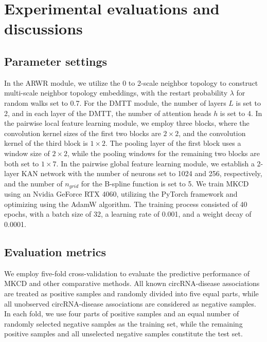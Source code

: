 \documentclass[journal=jcisd8,manuscript=article]{achemso}
\begin{document}
\vspace{-0.5cm}

\section{Experimental evaluations and discussions}

\subsection{Parameter settings}
\vspace{-0.3cm}
In the ARWR module, we utilize the 0 to 2-scale neighbor topology to construct multi-scale neighbor topology embeddings, with the restart probability $\lambda$ for random walks set to 0.7. For the DMTT module, the number of layers $L$ is set to 2, and in each layer of the DMTT, the number of attention heads $h$ is set to 4. In the pairwise local feature learning module, we employ three blocks, where the convolution kernel sizes of the first two blocks are $2\times 2$, and the convolution kernel of the third block is $1\times 2$. The pooling layer of the first block uses a window size of $2\times 2$, while the pooling windows for the remaining two blocks are both set to $1\times 7$. In the pairwise global feature learning module, we establish a 2-layer KAN network with the number of neurons set to 1024 and 256, respectively, and the number of $n_{grid}$ for the B-spline function is set to 5. We train MKCD using an Nvidia GeForce RTX 4060, utilizing the PyTorch framework and optimizing using the AdamW algorithm. The training process consisted of 40 epochs, with a batch size of 32, a learning rate of 0.001, and a weight decay of 0.0001.
\vspace{-0.5cm}

\subsection{Evaluation metrics}
\vspace{-0.3cm}
We employ five-fold cross-validation to evaluate the predictive performance of MKCD and other comparative methods. All known circRNA-disease associations are treated as positive samples and randomly divided into five equal parts, while all unobserved circRNA-disease associations are considered as negative samples. In each fold, we use four parts of positive samples and an equal number of randomly selected negative samples as the training set, while the remaining positive samples and all unselected negative samples constitute the test set.
\end{document}
